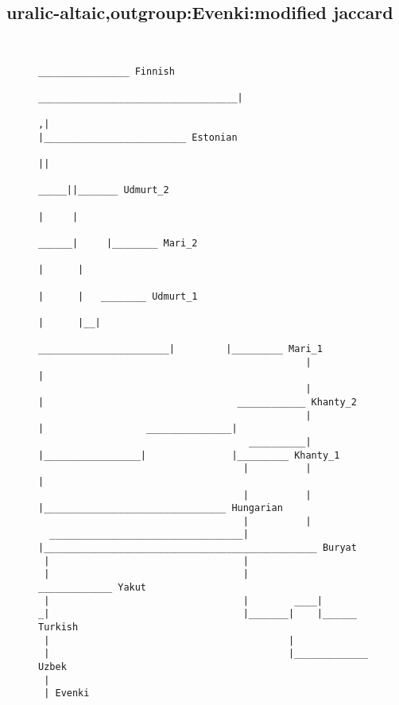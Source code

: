 \subsection{uralic-altaic,outgroup:Evenki:modified jaccard}
\begin{figure}[H]
\begin{center}
{
\selectfont
\begin{verbatim}

                                                                                                                          ________________ Finnish
                                                                                      ___________________________________|
                                                                                    ,|                                   |_________________________ Estonian
                                                                                    ||
                                                                               _____||_______ Udmurt_2
                                                                              |     |
                                                                        ______|     |________ Mari_2
                                                                       |      |
                                                                       |      |   ________ Udmurt_1
                                                                       |      |__|
                                                _______________________|         |_________ Mari_1
                                               |                       |
                                               |                       |                                  ____________ Khanty_2
                                               |                       |                  _______________|
                                     __________|                       |_________________|               |_________ Khanty_1
                                    |          |                                         |
                                    |          |                                         |________________________________ Hungarian
                                    |          |
  __________________________________|          |________________________________________________ Buryat
 |                                  |
 |                                  |             _____________ Yakut
 |                                  |        ____|
_|                                  |_______|    |______ Turkish
 |                                          |
 |                                          |_____________ Uzbek
 |
 | Evenki



\end{verbatim}
}
\label{...}
\end{center}
\end{figure}
